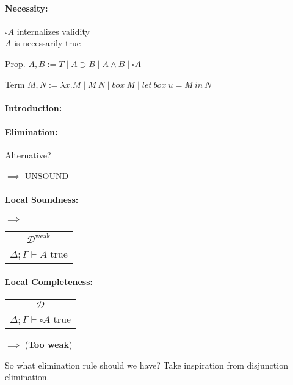 \documentclass[12 pt]{article}
\begin{document}
\paragraph{Necessity:} $\square A$ internalizes validity
\\ $A$ is necessarily true

Prop. $A, B := T \mid A \supset B \mid A \land B \mid \square
	A$

Term $M, N := \lambda x.M \mid M\ N \mid box\ M \mid let\ box\
	u = M\ in\ N$

\paragraph{Introduction:}
\begin{prooftree}
\end{prooftree}
\paragraph{Elimination:}
\begin{prooftree}
\end{prooftree}
Alternative?
\begin{center}
	\DP
	$\implies$ UNSOUND
\end{center}
\paragraph{Local Soundness:}
\begin{center}
	\noLine
	\DP
	$\implies$
	\begin{tabular}{c}
		$\mathcal{D}^{\text{weak}}$
		\\ $\Delta; \Gamma \vdash A$ true
	\end{tabular}
\end{center}
\paragraph{Local Completeness:}
\begin{center}
	\begin{tabular}{c}
		$\mathcal{D}$
		\\$\Delta; \Gamma \vdash \square A$ true
	\end{tabular}
	$\implies$
	\noLine
	\noLine
	\UIC{$\vdots$}
	\noLine
	\DP
	(\textbf{Too weak})
\end{center}
So what elimination rule should we have? Take inspiration from
disjunction elimination.
\begin{prooftree}
\end{prooftree}
\end{document}
